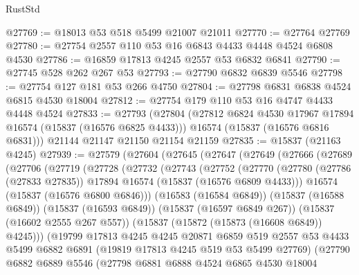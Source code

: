 \begin{lexlean}{RustStd}
\begin{coremodule}
@27769 := @18013 @53 @518 @5499 @21007 @21011
@27770 := @27764 @27769
@27780 := @27754 @2557 @110 @53 @16 @6843 @4433 @4448 @4524 @6808 @4530
@27786 := @16859 @17813 @4245 @2557 @53 @6832 @6841
@27790 := @27745 @528 @262 @267 @53
@27793 := @27790 @6832 @6839 @5546
@27798 := @27754 @127 @181 @53 @266 @4750
@27804 := @27798 @6831 @6838 @4524 @6815 @4530 @18004
@27812 := @27754 @179 @110 @53 @16 @4747 @4433 @4448 @4524
@27833 := @27793
    (@27804
      (@27812 @6824 @4530 @17967 @17894 @16574 (@15837 (@16576 @6825 @4433)))
      @16574
      (@15837 (@16576 @6816 @6831)))
    @21144
    @21147
    @21150
    @21154
    @21159
@27835 := @15837 (@21163 @4245)
@27939 := @27579
    (@27604
      (@27645
        (@27647
          (@27649
            (@27666
              (@27689
                (@27706
                  (@27719
                    (@27728
                      (@27732
                        (@27743
                          (@27752
                            (@27770
                              (@27780
                                (@27786 (@27833 @27835))
                                @17894
                                @16574
                                (@15837 (@16576 @6809 @4433)))
                              @16574
                              (@15837 (@16576 @6800 @6846)))
                            (@16583 (@16584 @6849))
                            (@15837 (@16588 @6849))
                            (@15837 (@16593 @6849))
                            (@15837 (@16597 @6849 @267))
                            (@15837 (@16602 @2555 @267 @557))
                            (@15837 (@15872 (@15873 (@16608 @6849)) @4245)))
                          (@19799
                            @17813
                            @4245
                            @4245
                            @20871
                            @6859
                            @519
                            @2557
                            @53
                            @4433
                            @5499
                            @6882
                            @6891
                            (@19819 @17813 @4245 @519 @53 @5499 @27769)
                            (@27790
                              @6882
                              @6889
                              @5546
                              (@27798
                                @6881
                                @6888
                                @4524
                                @6865
                                @4530
                                @18004

\end{coremodule}
\end{lexlean}
